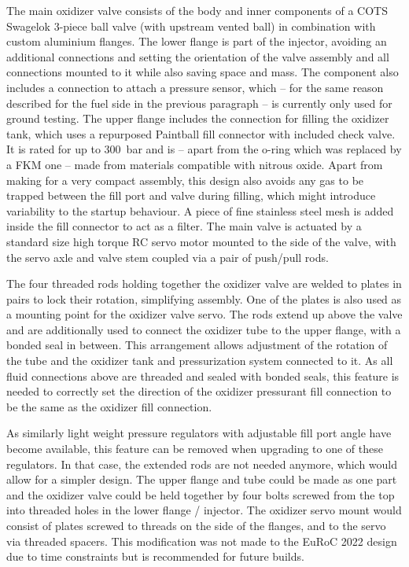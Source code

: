 The main oxidizer valve consists of the body and inner components of a COTS Swagelok 3-piece ball valve (with upstream vented ball) in combination with custom aluminium flanges.
The lower flange is part of the injector, avoiding an additional connections and setting the orientation of the valve assembly and all connections mounted to it while also saving space and mass. The component also includes a connection to attach a pressure sensor, which -- for the same reason described for the fuel side in the previous paragraph -- is currently only used for ground testing.
The upper flange includes the connection for filling the oxidizer tank, which uses a repurposed Paintball fill connector with included check valve. It is rated for up to \SI{300}{\bar} and is -- apart from the o-ring which was replaced by a FKM one -- made from materials compatible with nitrous oxide. Apart from making for a very compact assembly, this design also avoids any gas to be trapped between the fill port and valve during filling, which might introduce variability to the startup behaviour. A piece of fine stainless steel mesh is added inside the fill connector to act as a filter.
The main valve is actuated by a standard size high torque RC servo motor mounted to the side of the valve, with the servo axle and valve stem coupled via a pair of push/pull rods.

The four threaded rods holding together the oxidizer valve are welded to plates in pairs to lock their rotation, simplifying assembly. One of the plates is also used as a mounting point for the oxidizer valve servo. The rods extend up above the valve and are additionally used to connect the oxidizer tube to the upper flange, with a bonded seal in between. This arrangement allows adjustment of the rotation of the tube and the oxidizer tank and pressurization system connected to it. As all fluid connections above are threaded and sealed with bonded seals, this feature is needed to correctly set the direction of the oxidizer pressurant fill connection to be the same as the oxidizer fill connection.

As similarly light weight pressure regulators with adjustable fill port angle have become available, this feature can be removed when upgrading to one of these regulators. In that case, the extended rods are not needed anymore, which would allow for a simpler design. The upper flange and tube could be made as one part and the oxidizer valve could be held together by four bolts screwed from the top into threaded holes in the lower flange / injector. The oxidizer servo mount would consist of plates screwed to threads on the side of the flanges, and to the servo via threaded spacers. This modification was not made to the EuRoC 2022 design due to time constraints but is recommended for future builds. 

